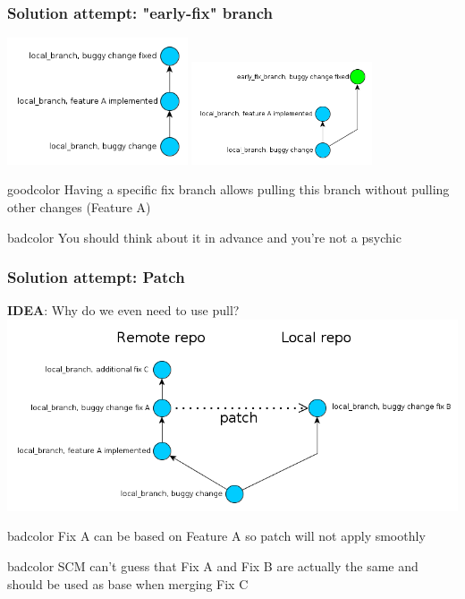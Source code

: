 \documentclass{beamer}
\begin{document}
\begin{frame}
\frametitle{Solution attempt: "early-fix" branch}
\begin{multicols}{2}
\includegraphics[width=0.4\textwidth]{img/early_fix_branch_bad}
\columnbreak
{}
\includegraphics[width=0.4\textwidth]{img/early_fix_branch_good}
\end{multicols}
\begin{beamercolorbox}[rounded=true,center,shadow=true]{goodcolor}
  Having a specific fix branch allows pulling this branch without pulling other changes (Feature A)
\end{beamercolorbox}
\begin{beamercolorbox}[rounded=true,center,shadow=true]{badcolor}
  You should think about it in advance and you're not a psychic
\end{beamercolorbox}
\end{frame}

\begin{frame}
\frametitle{Solution attempt: Patch}
\textbf{IDEA}: Why do we even need to use pull?
\includegraphics[width=\textwidth]{img/using_patch}

\begin{beamercolorbox}[rounded=true,center,shadow=true]{badcolor}
  Fix A can be based on Feature A so patch will not apply smoothly
\end{beamercolorbox}
\begin{beamercolorbox}[rounded=true,center,shadow=true]{badcolor}
  SCM can't guess that Fix A and Fix B are actually the same and should be used as base when merging Fix C
\end{beamercolorbox}
\end{frame}
\end{document}
